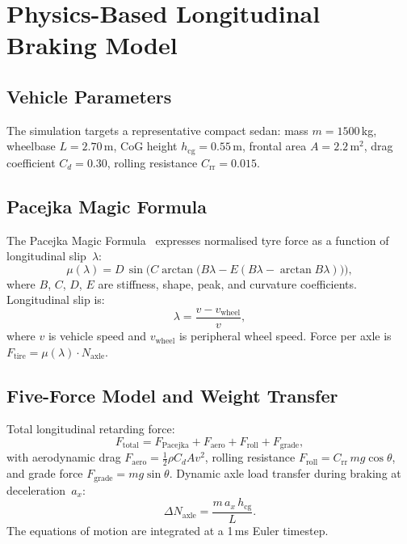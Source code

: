 \documentclass[journal]{IEEEtran}
\begin{document}
\section{Physics-Based Longitudinal Braking Model}
\label{sec:dynamics}

\subsection{Vehicle Parameters}

The simulation targets a representative compact sedan:
mass $m=1500$\,kg, wheelbase $L=2.70$\,m,
CoG height $h_\text{cg}=0.55$\,m,
frontal area $A=2.2$\,m$^2$, drag coefficient $C_d=0.30$,
rolling resistance $C_\text{rr}=0.015$.

\subsection{Pacejka Magic Formula}

The Pacejka Magic Formula~\cite{pacejka1992,pacejka2012} expresses
normalised tyre force as a function of longitudinal slip~$\lambda$:
\begin{equation}
  \mu(\lambda) = D\,\sin\!\bigl(C\arctan\bigl(B\lambda -
                E(B\lambda-\arctan B\lambda)\bigr)\bigr),
  \label{eq:magic}
\end{equation}
where $B$, $C$, $D$, $E$ are stiffness, shape, peak, and curvature
coefficients.
Longitudinal slip is:
\begin{equation}
  \lambda = \frac{v - v_\text{wheel}}{v},
  \label{eq:slip}
\end{equation}
where $v$ is vehicle speed and $v_\text{wheel}$ is peripheral wheel
speed.
Force per axle is $F_\text{tire}=\mu(\lambda)\cdot N_\text{axle}$.

\subsection{Five-Force Model and Weight Transfer}

Total longitudinal retarding force:
\begin{equation}
  F_\text{total} = F_\text{Pacejka} + F_\text{aero} +
                   F_\text{roll} + F_\text{grade},
  \label{eq:ftotal}
\end{equation}
with aerodynamic drag $F_\text{aero}=\tfrac{1}{2}\rho C_d A v^2$,
rolling resistance $F_\text{roll}=C_\text{rr}\,mg\cos\theta$,
and grade force $F_\text{grade}=mg\sin\theta$.
Dynamic axle load transfer during braking at deceleration~$a_x$:
\begin{equation}
  \Delta N_\text{axle} = \frac{m\,a_x\,h_\text{cg}}{L}.
  \label{eq:wt}
\end{equation}
The equations of motion are integrated at a 1\,ms Euler timestep.
\end{document}
